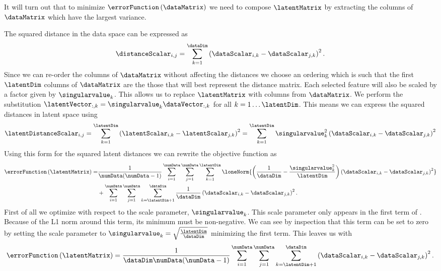 It will turn out that to minimize $\errorFunction\left(\dataMatrix\right)$
we need to compose $\latentMatrix$ by extracting the columns of
$\dataMatrix$ which have the largest variance.

The squared distance in the data space can be expressed as
\[
\distanceScalar_{i,j}=\sum_{k=1}^{\dataDim}\left(\dataScalar_{i,k}-\dataScalar_{j,k}\right)^{2}.
\]
Since we can re-order the columns of $\dataMatrix$ without affecting
the distances we choose an ordering which is such that the first
$\latentDim$ columns of $\dataMatrix$ are the those that will best
represent the distance matrix. Each selected feature will also be
scaled by a factor given by $\singularvalue_k$. This allows us to
replace $\latentMatrix$ with columns from $\dataMatrix$. We perform
the substitution
$\latentVector_{:,k}=\singularvalue_k\dataVector_{:,k}$ for all
$k=1\dots\latentDim$. This means we can express the squared distances
in latent space using
\[
\latentDistanceScalar_{i,j}=\sum_{k=1}^{\latentDim}\left(\latentScalar_{i,k}-\latentScalar_{j,k}\right)^{2}=\sum_{k=1}^{\latentDim}\singularvalue^2_k\left(\dataScalar_{i,k}-\dataScalar_{j,k}\right)^{2}
\]
Using this form for the squared latent distances we can rewrite the
objective function as
\begin{align}
\errorFunction\left(\latentMatrix\right) = & \frac{1}{\numData(\numData-1)}\sum_{i=1}^{\numData}\sum_{j=1}^{\numData}\sum_{k=1}^\latentDim\loneNorm{\left(\frac{1}{\dataDim}-\frac{\singularvalue_k^2}{\latentDim}\right)\left(\dataScalar_{i,k}-\dataScalar_{j,k}\right)^{2}} \nonumber \\&+  \sum_{i=1}^{\numData}\sum_{j=1}^{\numData}\sum_{k=\latentDim+1}^{\dataDim}\frac{1}{\dataDim}\left(\dataScalar_{i,k}-\dataScalar_{j,k}\right)^{2}.\label{eq:distObjectiveExpanded}
\end{align}
First of all we optimize with respect to the scale parameter,
$\singularvalue_k$. This scale parameter only appears in the first
term of . Because of the L1 norm
around this term, its minimum must be non-negative. We can see by
inspection that this term can be set to zero by setting the scale
parameter to
$\singularvalue_k=\sqrt{\frac{\latentDim}{\dataDim}}$ minimizing the first term. This leaves us with
\[
\errorFunction\left(\latentMatrix\right)  = \frac{1}{\dataDim\numData(\numData-1)}\sum_{i=1}^{\numData}\sum_{j=1}^{\numData}\sum_{k=\latentDim+1}^{\dataDim}\left(\dataScalar_{i,k}-\dataScalar_{j,k}\right)^{2}.
\]
